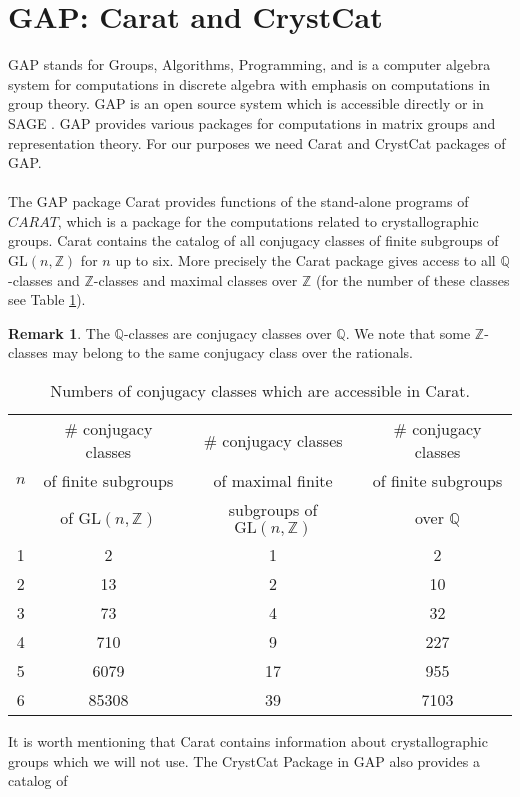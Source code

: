\documentclass{article}
\theoremstyle{plain}
\theoremstyle{definition}
\newtheorem*{remark}{Remark}
\newcommand{\Z}{\ensuremath{\mathbb{Z}}}
\newcommand{\Q}{\ensuremath{\mathbb{Q}}}
\begin{document}
\section{GAP: Carat and CrystCat}
GAP \cite{GAP4} stands for Groups, Algorithms, Programming, and is a computer 
algebra system for computations in discrete algebra with emphasis on computations 
in group theory. GAP is an open source system which is accessible directly or 
in SAGE \cite{sagemath}. GAP provides various packages for computations in matrix 
groups and representation theory. For our purposes we need Carat and CrystCat packages of GAP.\\
\\
The GAP package Carat provides functions of the stand-alone programs of $CARAT$, 
which is a package for the computations related to crystallographic groups. Carat 
contains the catalog of all conjugacy classes of finite subgroups of $\mathrm{GL}(n,\Z)$ 
for $n$ up to six. More precisely the Carat package gives access to all 
$\Q$-classes and $\Z$-classes and maximal classes over $\Z$ (for the number of 
these classes see Table \ref{tbl:Carat}).  
\begin{remark}
The $\Q$-classes are conjugacy classes over $\Q$. We note that some $\Z$-classes 
may belong to the same conjugacy class over the rationals.
\end{remark}
\begin{table}[H]
\centering
\begin{tabular}{|c|c|c|c|}
\hline
 & \# conjugacy classes  & \# conjugacy classes & \# conjugacy classes \\
 $ n$ & of finite subgroups & of maximal finite  & of finite subgroups\\
		 &  of $\mathrm{GL}(n,\Z)$& subgroups of $\mathrm{GL}(n,\Z)$ & over $\Q$\\
 \hline
 1 & 2& 1 & 2\\
 2 & 13& 2 & 10\\
 3 & 73& 4 & 32\\ 
  4 & 710 & 9 & 227\\
  5 & 6079& 17 & 955\\
 6 & 85308& 39 & 7103\\
\hline
\end{tabular}
\caption{Numbers of conjugacy classes which are accessible in Carat.}
\label{tbl:Carat}
\end{table}
\noindent
It is worth mentioning that Carat contains information about crystallographic groups 
which we will not use. The CrystCat Package in GAP also provides a catalog of 
\end{document}
